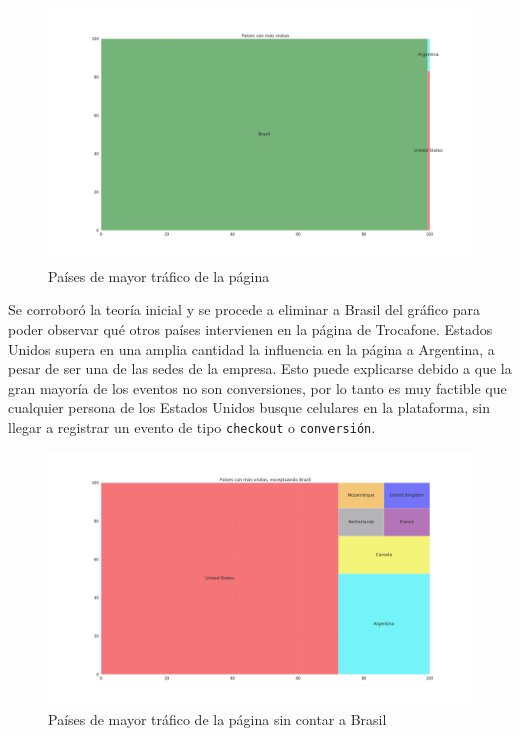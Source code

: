 \documentclass[a4paper]{article}
\begin{document}
\begin{figure}[h!]
	\includegraphics[width=\linewidth]{figures/050-paises_visitas-treemap.png}
	\caption{Países de mayor tráfico de la página}
	\label{brazilrules}
\end{figure}

Se corroboró la teoría inicial y se procede a eliminar a Brasil del gráfico para poder observar qué otros países intervienen en la página de Trocafone. Estados Unidos supera en una amplia cantidad la influencia en la página a Argentina, a pesar de ser una de las sedes de la empresa. Esto puede explicarse debido a que la gran mayoría de los eventos no son conversiones, por lo tanto es muy factible que cualquier persona de los Estados Unidos busque celulares en la plataforma, sin llegar a registrar un evento de tipo \texttt{checkout} o \texttt{conversión}.

\begin{figure}[h!]
	\includegraphics[width=\linewidth]{figures/051-paises_visitas_sin_brazil-treemap.png}
	\caption{Países de mayor tráfico de la página sin contar a Brasil}
	\label{brazilsucks}
\end{figure}
\end{document}
